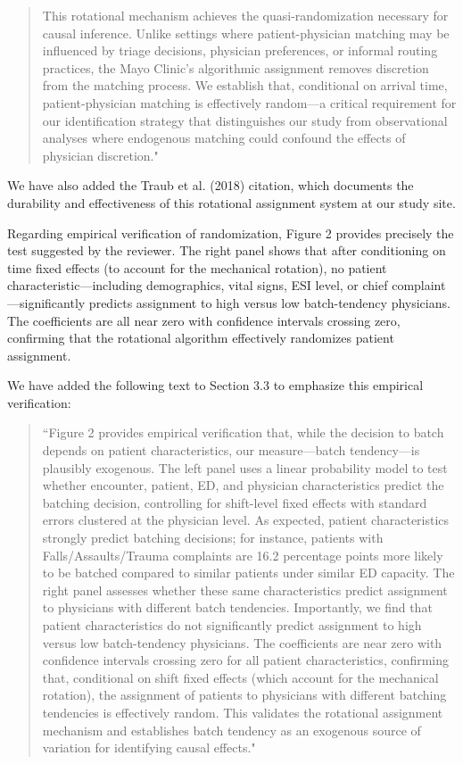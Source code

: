\documentclass[11pt]{article}
\newcommand{\1}{\hbox{\rm 1\kern-.35em 1}}
\begin{document}
{{\begin{quote}
    This rotational mechanism achieves the quasi-randomization necessary for causal inference. Unlike settings where patient-physician matching may be influenced by triage decisions, physician preferences, or informal routing practices, the Mayo Clinic's algorithmic assignment removes discretion from the matching process. We establish that, conditional on arrival time, patient-physician matching is effectively random---a critical requirement for our identification strategy that distinguishes our study from observational analyses where endogenous matching could confound the effects of physician discretion."
\end{quote}

We have also added the Traub et al. (2018) citation, which documents the durability and effectiveness of this rotational assignment system at our study site.

Regarding empirical verification of randomization, Figure 2 provides precisely the test suggested by the reviewer. The right panel shows that after conditioning on time fixed effects (to account for the mechanical rotation), no patient characteristic—including demographics, vital signs, ESI level, or chief complaint—significantly predicts assignment to high versus low batch-tendency physicians. The coefficients are all near zero with confidence intervals crossing zero, confirming that the rotational algorithm effectively randomizes patient assignment.

We have added the following text to Section 3.3 to emphasize this empirical verification: 

\begin{quote}
    ``Figure 2 provides empirical verification that, while the decision to batch depends on patient characteristics, our measure---batch tendency---is plausibly exogenous. The left panel uses a linear probability model to test whether encounter, patient, ED, and physician characteristics predict the batching decision, controlling for shift-level fixed effects with standard errors clustered at the physician level. As expected, patient characteristics strongly predict batching decisions; for instance, patients with Falls/Assaults/Trauma complaints are 16.2 percentage points more likely to be batched compared to similar patients under similar ED capacity. The right panel assesses whether these same characteristics predict assignment to physicians with different batch tendencies. Importantly, we find that patient characteristics do not significantly predict assignment to high versus low batch-tendency physicians. The coefficients are near zero with confidence intervals crossing zero for all patient characteristics, confirming that, conditional on shift fixed effects (which account for the mechanical rotation), the assignment of patients to physicians with different batching tendencies is effectively random. This validates the rotational assignment mechanism and establishes batch tendency as an exogenous source of variation for identifying causal effects."
\end{quote}

}}
\end{document}
